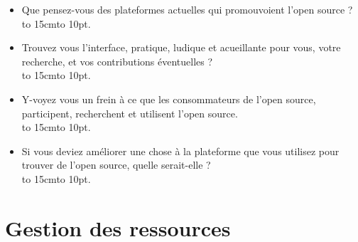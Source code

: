 \begin{appendices}
\begin{itemize}[label=\textbullet, font=\LARGE \color{burntorange}]
	\item Que pensez-vous des plateformes actuelles qui promouvoient l'open source ?\\
	\hbox to 15cm{\leaders\hbox to 10pt{\hss . \hss}\hfil}
	\item Trouvez vous l'interface, pratique, ludique et acueillante pour vous, votre recherche, et vos contributions éventuelles ?\\
	\hbox to 15cm{\leaders\hbox to 10pt{\hss . \hss}\hfil}
	\item Y-voyez vous un frein à ce que les consommateurs de l'open source, participent, recherchent et utilisent l'open source.\\
	\hbox to 15cm{\leaders\hbox to 10pt{\hss . \hss}\hfil}
	\item Si vous deviez améliorer une chose à la plateforme que vous utilisez pour trouver de l'open source, quelle serait-elle ?\\
	\hbox to 15cm{\leaders\hbox to 10pt{\hss . \hss}\hfil}

\end{itemize}

\section{Gestion des ressources}


\end{appendices}
